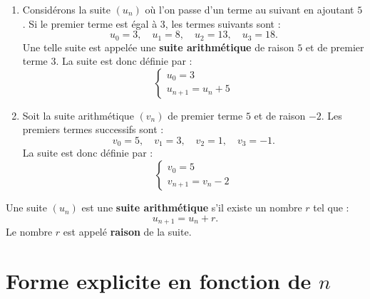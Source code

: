 \documentclass[10pt,a4paper]{article}
\begin{document}
\begin{ex}
	\begin{enumerate}
		\item[a)] Considérons la suite $(u_n)$ où l'on passe d'un terme au suivant en ajoutant $5$.
		      Si le premier terme est égal à $3$, les termes suivants sont :
		      $$
			      u_0 = 3, \quad u_1 = 8, \quad u_2 = 13, \quad u_3 = 18.
		      $$
		      Une telle suite est appelée une \textbf{suite arithmétique} de raison $5$ et de premier terme $3$.
		      La suite est donc définie par :
		      $$
			      \begin{cases}
				      u_0 = 3 \\
				      u_{n+1} = u_n + 5
			      \end{cases}
		      $$

		\item[b)] Soit la suite arithmétique $(v_n)$ de premier terme $5$ et de raison $-2$.
		      Les premiers termes successifs sont :
		      $$
			      v_0 = 5, \quad v_1 = 3, \quad v_2 = 1, \quad v_3 = -1.
		      $$
		      La suite est donc définie par :
		      $$
			      \begin{cases}
				      v_0 = 5 \\
				      v_{n+1} = v_n - 2
			      \end{cases}
		      $$
	\end{enumerate}
\end{ex}

\begin{defi}
	Une suite $(u_n)$ est une \textbf{suite arithmétique} s'il existe un nombre $r$ tel que :
	$$
		u_{n+1} = u_n + r.
	$$
	Le nombre $r$ est appelé \textbf{raison} de la suite.
\end{defi}

\section{Forme explicite en fonction de $n$}
\end{document}
